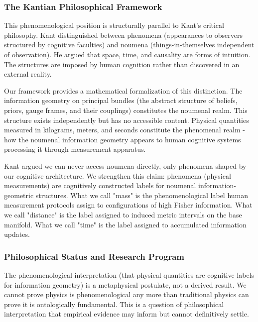 \documentclass[11pt]{article}
\begin{document}
\subsubsection{The Kantian Philosophical Framework}

This phenomenological position is structurally parallel to Kant's critical philosophy. Kant distinguished between phenomena (appearances to observers structured by cognitive faculties) and noumena (things-in-themselves independent of observation). He argued that space, time, and causality are forms of intuition.  The structures are imposed by human cognition rather than discovered in an external reality.

Our framework provides a mathematical formalization of this distinction. The information geometry on principal bundles (the abstract structure of beliefs, priors, gauge frames, and their couplings) constitutes the noumenal realm. This structure exists independently but has no accessible content. Physical quantities measured in kilograms, meters, and seconds constitute the phenomenal realm - how the noumenal information geometry appears to human cognitive systems processing it through measurement apparatus.

Kant argued we can never access noumena directly, only phenomena shaped by our cognitive architecture. We strengthen this claim: phenomena (physical measurements) are cognitively constructed labels for noumenal information-geometric structures. What we call "mass" is the phenomenological label human measurement protocols assign to configurations of high Fisher information. What we call "distance" is the label assigned to induced metric intervals on the base manifold. What we call "time" is the label assigned to accumulated information updates.


\subsubsection{Philosophical Status and Research Program}

The phenomenological interpretation (that physical quantities are cognitive labels for information geometry) is a metaphysical postulate, not a derived result. We cannot prove physics is phenomenological any more than traditional physics can prove it is ontologically fundamental. This is a question of philosophical interpretation that empirical evidence may inform but cannot definitively settle.
\end{document}
